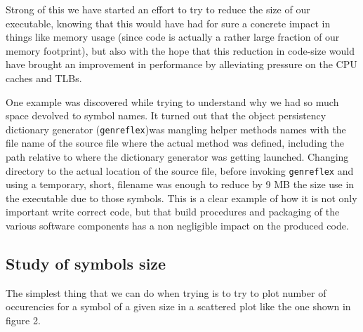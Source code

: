 \documentclass[a4paper]{jpconf}
\begin{document}
Strong of this we have started an effort to try to reduce the size of our executable, knowing that this would have had for sure a concrete impact in things like memory usage (since code is actually a rather large fraction of our memory footprint), but also with the hope that this reduction in code-size would have brought an improvement in performance by alleviating pressure on the CPU caches and TLBs.


One example was discovered while trying to understand why we had so much space devolved to symbol names. It turned out that the object persistency dictionary generator (\texttt{genreflex})was mangling helper methods names with the file name of the source file where the actual method was defined, including the path relative to where the dictionary generator was getting launched. Changing directory to the actual location of the source file, before invoking \texttt{genreflex} and using a temporary, short, filename was enough to reduce by 9 MB the size use in the executable due to those symbols. This is a clear example of how it is not only important write correct code, but that build procedures and packaging of the various software components has a non negligible impact on the produced code.


\subsection{Study of symbols size}
\label{studyofsymbolssize}

The simplest thing that we can do when trying is to try to plot number of occurencies for a symbol of a given size in a scattered plot like the one shown in figure 2.


\begin{figure}
\caption{}
\label{}
\begin{center}
\end{center}
\end{figure}
\end{document}
